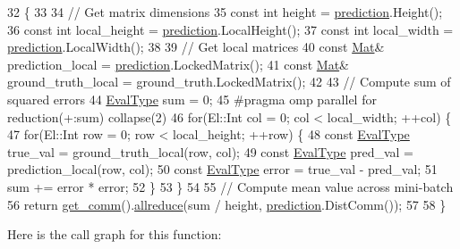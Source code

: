 \begin{DoxyCode}
32                                                                                      \{
33 
34   \textcolor{comment}{// Get matrix dimensions}
35   \textcolor{keyword}{const} \textcolor{keywordtype}{int} height = \hyperlink{base_8hpp_a2781a159088df64ed7d47cc91c4dc0a8ac41b9ec75e920b610e8907e066074b30}{prediction}.Height();
36   \textcolor{keyword}{const} \textcolor{keywordtype}{int} local\_height = \hyperlink{base_8hpp_a2781a159088df64ed7d47cc91c4dc0a8ac41b9ec75e920b610e8907e066074b30}{prediction}.LocalHeight();
37   \textcolor{keyword}{const} \textcolor{keywordtype}{int} local\_width = \hyperlink{base_8hpp_a2781a159088df64ed7d47cc91c4dc0a8ac41b9ec75e920b610e8907e066074b30}{prediction}.LocalWidth();
38   
39   \textcolor{comment}{// Get local matrices}
40   \textcolor{keyword}{const} \hyperlink{base_8hpp_a68f11fdc31b62516cb310831bbe54d73}{Mat}& prediction\_local = \hyperlink{base_8hpp_a2781a159088df64ed7d47cc91c4dc0a8ac41b9ec75e920b610e8907e066074b30}{prediction}.LockedMatrix();
41   \textcolor{keyword}{const} \hyperlink{base_8hpp_a68f11fdc31b62516cb310831bbe54d73}{Mat}& ground\_truth\_local = ground\_truth.LockedMatrix();
42 
43   \textcolor{comment}{// Compute sum of squared errors}
44   \hyperlink{base_8hpp_a3266f5ac18504bbadea983c109566867}{EvalType} sum = 0;
45 \textcolor{preprocessor}{  #pragma omp parallel for reduction(+:sum) collapse(2)}
46   \textcolor{keywordflow}{for}(El::Int col = 0; col < local\_width; ++col) \{
47     \textcolor{keywordflow}{for}(El::Int row = 0; row < local\_height; ++row) \{
48       \textcolor{keyword}{const} \hyperlink{base_8hpp_a3266f5ac18504bbadea983c109566867}{EvalType} true\_val = ground\_truth\_local(row, col);
49       \textcolor{keyword}{const} \hyperlink{base_8hpp_a3266f5ac18504bbadea983c109566867}{EvalType} pred\_val = prediction\_local(row, col);
50       \textcolor{keyword}{const} \hyperlink{base_8hpp_a3266f5ac18504bbadea983c109566867}{EvalType} error = true\_val - pred\_val;
51       sum += error * error;
52     \}
53   \}
54   
55   \textcolor{comment}{// Compute mean value across mini-batch}
56   \textcolor{keywordflow}{return} \hyperlink{classlbann_1_1metric_a464120720df6bfdf91bffe353e562964}{get\_comm}().\hyperlink{classlbann_1_1lbann__comm_af5631e5f0f54e4df4958eba9df2599ef}{allreduce}(sum / height, \hyperlink{base_8hpp_a2781a159088df64ed7d47cc91c4dc0a8ac41b9ec75e920b610e8907e066074b30}{prediction}.DistComm());
57 
58 \}
\end{DoxyCode}
Here is the call graph for this function\+:\nopagebreak
